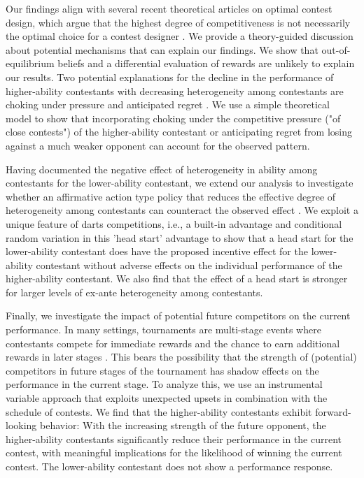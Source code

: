 \documentclass[11pt,a4paper]{article}
\begin{document}
Our findings align with several recent theoretical articles on optimal contest design, which argue that the highest degree of competitiveness is not necessarily the optimal choice for a contest designer \cite{Fang.2020, kirkegaard.2023, Letina.2023}. We provide a theory-guided discussion about potential mechanisms that can explain our findings. We show that out-of-equilibrium beliefs and a differential evaluation of rewards are unlikely to explain our results. Two potential explanations for the decline in the performance of higher-ability contestants with decreasing heterogeneity among contestants are choking under pressure \cite{Baumeister.1984, Ariely.2009, Harb.2019} and anticipated regret \cite{Hyndman.2012}. We use a simple theoretical model to show that incorporating choking under the competitive pressure ("of close contests") of the higher-ability contestant or anticipating regret from losing against a much weaker opponent can account for the observed pattern. \par 

Having documented the negative effect of heterogeneity in ability among contestants for the lower-ability contestant, we extend our analysis to investigate whether an affirmative action type policy that reduces the effective degree of heterogeneity among contestants can counteract the observed effect \cite{Chowdhury.2023}. We exploit a unique feature of darts competitions, i.e., a built-in advantage and conditional random variation in this 'head start' advantage to show that a head start for the lower-ability contestant does have the proposed incentive effect for the lower-ability contestant without adverse effects on the individual performance of the higher-ability contestant. We also find that the effect of a head start is stronger for larger levels of ex-ante heterogeneity among contestants.\par

Finally, we investigate the impact of potential future competitors on the current performance. In many settings, tournaments are multi-stage events where contestants compete for immediate rewards and the chance to earn additional rewards in later stages \cite{Sheremeta2010, Segev2014}. This bears the possibility that the strength of (potential) competitors in future stages of the tournament has shadow effects on the performance in the current stage. To analyze this, we use an instrumental variable approach that exploits unexpected upsets in combination with the schedule of contests. We find that the higher-ability contestants exhibit forward-looking behavior: With the increasing strength of the future opponent, the higher-ability contestants significantly reduce their performance in the current contest, with meaningful implications for the likelihood of winning the current contest. The lower-ability contestant does not show a performance response. \par
\end{document}
